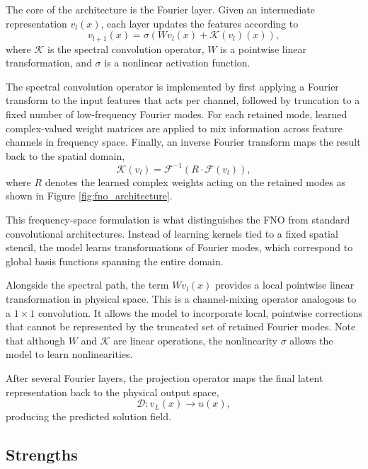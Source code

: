 The core of the architecture is the Fourier layer. Given an intermediate representation $v_l(x)$, each layer updates the features according to
\begin{equation}
v_{l+1}(x)
=
\sigma
\left(
Wv_l(x)
+
\mathcal{K}(v_l)(x)
\right),
\end{equation}
where $\mathcal{K}$ is the spectral convolution operator, $W$ is a pointwise linear transformation, and $\sigma$ is a nonlinear activation function.

The spectral convolution operator is implemented by first applying a Fourier transform to the input features that acts per channel, followed by truncation to a fixed number of low-frequency Fourier modes. For each retained mode, learned complex-valued weight matrices are applied to mix information across feature channels in frequency space. Finally, an inverse Fourier transform maps the result back to the spatial domain,
\begin{equation}
\mathcal{K}(v_l)
=
\mathcal{F}^{-1}
\left(
R \cdot \mathcal{F}(v_l)
\right),
\end{equation}
where $R$ denotes the learned complex weights acting on the retained modes as shown in Figure \ref{fig:fno_architecture}.

This frequency-space formulation is what distinguishes the FNO from standard convolutional architectures. Instead of learning kernels tied to a fixed spatial stencil, the model learns transformations of Fourier modes, which correspond to global basis functions spanning the entire domain.

Alongside the spectral path, the term $Wv_l(x)$ provides a local pointwise linear transformation in physical space. This is a channel-mixing operator analogous to a $1 \times 1$ convolution. It allows the model to incorporate local, pointwise corrections that cannot be represented by the truncated set of retained Fourier modes. Note that although $W$ and $\mathcal{K}$ are linear operations, the nonlinearity $\sigma$ allows the model to learn nonlinearities.

After several Fourier layers, the projection operator maps the final latent representation back to the physical output space,
\begin{equation}
\mathcal{D}: v_L(x) \rightarrow u(x),
\end{equation}
producing the predicted solution field.

\subsection{Strengths}

